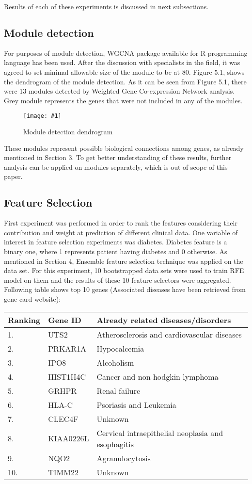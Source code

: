 \documentclass{ba-kecs}
\numberwithin{figure}{section}
\numberwithin{equation}{section}
\newcommand{\dkepic}[2]{ %
	\begin{figure}[H] %
	\texttt{[image: \#1]}
	\caption{#2}
	\label{#1}
	\end{figure}
}
\begin{document}
Results of each of these experiments is discussed in next subsections.

\subsection{Module detection}

For purposes of module detection, WGCNA package available for R programming language has been used. After the discussion with specialists in the field, it was agreed to set minimal allowable size of the module to be at 80. Figure 5.1, shows the dendrogram of the module detection. As it can be seen from Figure 5.1, there were 13 modules detected by Weighted Gene Co-expression Network analysis. Grey module represents the genes that were not included in any of the modules.
\dkepic{dendrogram}{Module detection dendrogram}

These modules represent possible biological connections among genes, as already mentioned in Section 3. To get better understanding of these results, further analysis can be applied on modules separately, which is out of scope of this paper.

\subsection{Feature Selection}

First experiment was performed in order to rank the features considering their contribution and weight at prediction of different clinical data. One variable of interest in feature selection experiments was diabetes. Diabetes feature is a binary one, where 1 represents patient having diabetes and 0 otherwise. As mentioned in Section 4, Ensemble feature selection technique was applied on the data set. For this experiment, 10 bootstrapped data sets were used to train RFE model on them and the results of these 10 feature selectors were aggregated. Following table shows top 10 genes (Associated diseases have been retrieved from gene card website):
\begin{center}
\begin{tabular}{|l|l|p{4cm}|}
\hline
Ranking & Gene ID & Already related diseases/disorders\\ \hline
1. & UTS2 & Atherosclerosis and cardiovascular diseases\\ \hline
2. & PRKAR1A & Hypocalcemia\\ \hline
3. & IPO8 & Alcoholism\\ \hline
4. & HIST1H4C & Cancer and non-hodgkin lymphoma \\ \hline
5. & GRHPR & Renal failure \\ \hline
6. & HLA-C & Psoriasis and Leukemia\\ \hline
7. & CLEC4F & Unknown\\ \hline
8. & KIAA0226L & Cervical intraepithelial neoplasia and esophagitis\\ \hline
9. & NQO2 & Agranulocytosis\\ \hline
10. & TIMM22 & Unknown\\ \hline
\end{tabular}
\end{center}
\end{document}
